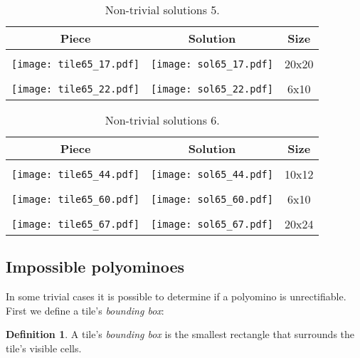 \documentclass[10pt,a4paper]{article}
\theoremstyle{definition}
\newtheorem{defn}{Definition}[section]
\begin{document}
\pagebreak
\begin{table}[!htpb]
\centering
\begin{tabular}{|c|c|c|}
\hline
Piece & Solution & Size\\ \hline
 & & \\ 
\texttt{[image: tile65\_17.pdf]} &\texttt{[image: sol65\_17.pdf]} &20x20 \\ \hline
 & & \\ 
\texttt{[image: tile65\_22.pdf]} &\texttt{[image: sol65\_22.pdf]} &6x10 \\ \hline
\end{tabular}
\caption{Non-trivial solutions 5.}
\label{tab:cool5}
\end{table}

\pagebreak
\begin{table}[!htpb]
\centering
\begin{tabular}{|c|c|c|}
\hline
Piece & Solution & Size\\ \hline
 & & \\ 
\texttt{[image: tile65\_44.pdf]} &\texttt{[image: sol65\_44.pdf]} &10x12 \\ \hline
 & & \\ 
\texttt{[image: tile65\_60.pdf]} &\texttt{[image: sol65\_60.pdf]} &6x10 \\ \hline
 & & \\ 
\texttt{[image: tile65\_67.pdf]} &\texttt{[image: sol65\_67.pdf]} &20x24 \\ \hline
\end{tabular}
\caption{Non-trivial solutions 6.}
\label{tab:cool6}
\end{table}







\pagebreak
\subsection{Impossible polyominoes}

In some trivial cases it is possible to determine if a polyomino is unrectifiable. First we define a tile's \emph{bounding box}:

\begin{defn}
A tile's \emph{bounding box} is the smallest rectangle that surrounds the tile's visible cells.
\end{defn}
\end{document}
